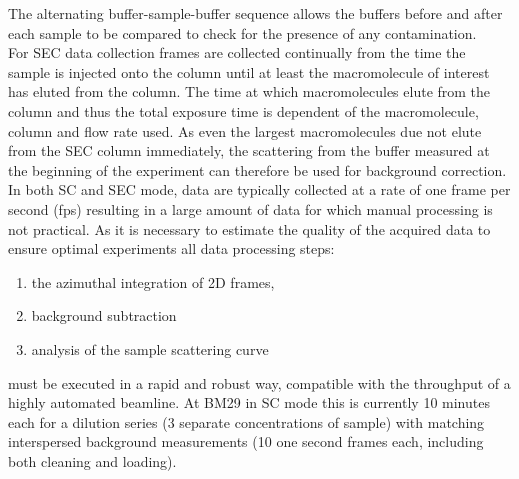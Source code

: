 \documentclass[preprint,pdf]{iucr}              %
\begin{document}
The alternating buffer-sample-buffer sequence allows the buffers before and after each sample to be compared to check for the presence of any contamination.\\
For SEC data collection frames are collected continually from the time the sample is injected onto the column until at least the macromolecule of interest has eluted from the column.
The time at which macromolecules  elute from the column and thus the total exposure time is dependent of the macromolecule,  column and flow rate used. 
As even the largest macromolecules due not elute from the SEC column immediately, the scattering from the buffer measured at the beginning of the experiment can therefore be used for background correction.\\

In both SC and SEC mode, data are typically collected at a rate of one frame per second (fps) resulting in a large amount of data for which manual processing is not practical. 
As it is necessary to estimate the quality of the acquired data to ensure optimal experiments all data processing steps:
\begin{enumerate}
\item the azimuthal integration of 2D frames,
\item background subtraction 
\item analysis of the sample scattering curve 
\end{enumerate}
must be executed in a rapid and robust way, compatible with the throughput of a highly automated beamline. 
At BM29 in SC mode this is currently 10 minutes each for a dilution series (3 separate concentrations of sample) with matching interspersed background measurements  (10 one second frames each, including both cleaning and loading).
\end{document}
